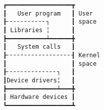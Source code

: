 \documentclass[varwidth,crop]{standalone}
\begin{document}
\begin{verbatim}
┏━━━━━━━━━━━━━━━━━━┳
┃   User program   ┃ User
┠╴╴╴╴╴╴╴╴╴╴╴┐      ┃ space
┃ Libraries ╎      ┃
┣━━━━━━━━━━━┷━━━━━━╋
┃   System calls   ┃
┠╴╴╴╴╴╴╴╴╴╴╴╴╴╴╴╴╴╴┨ Kernel
┃                  ┃ space
┠╴╴╴╴╴╴╴╴╴╴╴╴╴╴┐   ┃
┃Device drivers╎   ┃
┣━━━━━━━━━━━━━━┷━━━╋
┃ Hardware devices ┃
┗━━━━━━━━━━━━━━━━━━┻
\end{verbatim}
\end{document}
